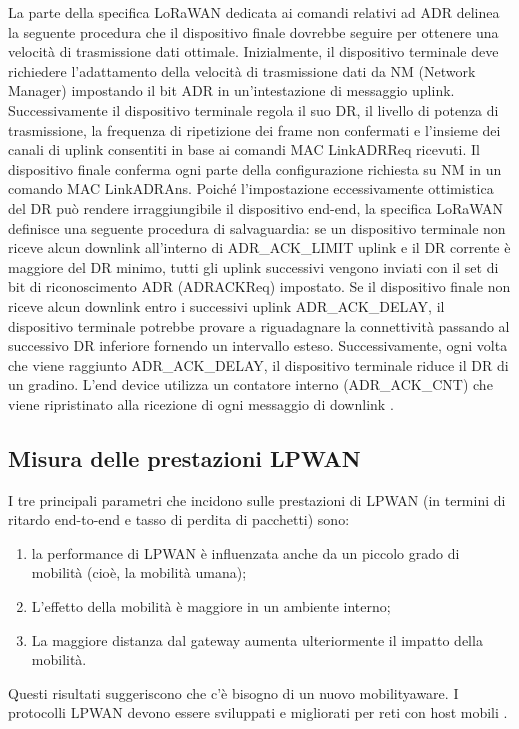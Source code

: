 \documentclass[a4paper]{report} %
\begin{document}
La parte della specifica LoRaWAN dedicata ai comandi relativi ad ADR delinea la seguente procedura che il dispositivo finale dovrebbe seguire per ottenere una velocità di trasmissione dati ottimale. Inizialmente, il dispositivo terminale deve richiedere l'adattamento della velocità di trasmissione dati da NM (Network Manager) impostando il bit ADR in un'intestazione di messaggio uplink. Successivamente il dispositivo terminale regola il suo DR, il livello di potenza di trasmissione, la frequenza di ripetizione dei frame non confermati e l'insieme dei canali di uplink consentiti in base ai comandi MAC LinkADRReq ricevuti. Il dispositivo finale conferma ogni parte della configurazione richiesta su NM in un comando MAC LinkADRAns. Poiché l'impostazione eccessivamente ottimistica del DR può rendere irraggiungibile il dispositivo end-end, la specifica LoRaWAN definisce una seguente procedura di salvaguardia: se un dispositivo terminale non riceve alcun downlink all'interno di ADR\_ACK\_LIMIT uplink e il DR corrente è maggiore del DR minimo, tutti gli uplink successivi vengono inviati con il set di bit di riconoscimento ADR (ADRACKReq) impostato. Se il dispositivo finale non riceve alcun downlink entro i successivi uplink ADR\_ACK\_DELAY, il dispositivo terminale potrebbe provare a riguadagnare la connettività passando al successivo DR inferiore fornendo un intervallo esteso. Successivamente, ogni volta che viene raggiunto ADR\_ACK\_DELAY, il dispositivo terminale riduce il DR di un gradino. L'end device utilizza un contatore interno (ADR\_ACK\_CNT) che viene ripristinato alla ricezione di ogni messaggio di downlink \cite{art:rif.48}.

\subsection{Misura delle prestazioni LPWAN}
I tre principali parametri che incidono sulle prestazioni di LPWAN (in termini di ritardo end-to-end e tasso di perdita di pacchetti) sono: 
\begin{enumerate}
\item la performance di LPWAN è influenzata anche da un piccolo grado di mobilità (cioè, la mobilità umana);
\item L'effetto della mobilità è maggiore in un ambiente interno;
\item La maggiore distanza dal gateway aumenta ulteriormente il impatto della mobilità.
\end{enumerate}
Questi risultati suggeriscono che c'è bisogno di un nuovo mobilityaware. I protocolli LPWAN devono essere sviluppati e migliorati per reti con host mobili \cite{art:rif.25}.
\end{document}
